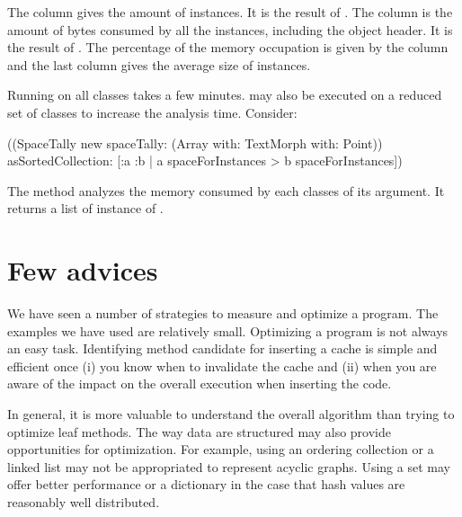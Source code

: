 \documentclass[a4paper,10pt,twoside]{book}
\begin{document}
The  column gives the amount of instances. It is the result of . 
The  column is the amount of bytes consumed by all the instances, including the object header. It is the result of .
The percentage of the memory occupation is given by the column  and the last column gives the average size of instances.

Running  on all classes takes a few minutes.  may also be executed on a reduced set of classes to increase the analysis time. Consider:


\begin{code}{}
((SpaceTally new spaceTally: (Array with: TextMorph with: Point)) 
	asSortedCollection: [:a :b | a spaceForInstances > b spaceForInstances]) 
\end{code}

The method  analyzes the memory consumed by each classes of its argument. It returns a list of instance of .



\section{Few advices}

We have seen a number of strategies to measure and optimize a program. The examples we have used are relatively small. Optimizing a program is not always an easy task. Identifying method candidate for inserting a cache is simple and efficient once (i) you know when to invalidate the cache and (ii) when you are aware of the impact on the overall execution when inserting the code.

In general, it is more valuable to understand the overall algorithm than trying to optimize leaf methods. The way data are structured may also provide opportunities for optimization. For example, using an ordering collection or a linked list may not be appropriated to represent acyclic graphs. Using a set may offer better performance or a dictionary in the case that hash values are reasonably well distributed.
\end{document}
